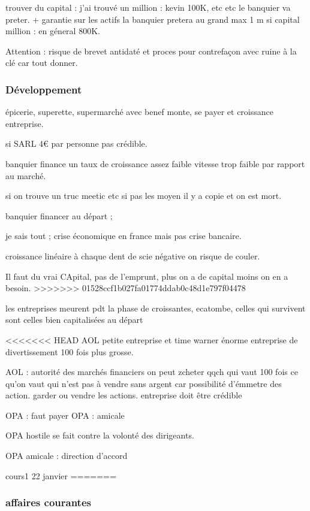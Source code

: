 \documentclass[a4paper,12pt]{article}
\begin{document}
trouver du capital : j'ai trouvé un million : kevin 100K, etc  etc 
le banquier va preter. + garantie sur les actifs la banquier pretera au grand max
1 m si capital million : en géneral 800K.

Attention : risque de brevet antidaté et proces pour contrefaçon avec ruine à la clé car tout donner.

\subsubsection{Développement}

épicerie, superette, supermarché avec benef monte, se payer et croissance entreprise. 


si SARL 4€ par personne pas crédible. 
 
banquier finance un taux de croissance assez faible vitesse trop faible par rapport au marché.

si on trouve un truc meetic etc si pas les moyen il y a copie et on est mort.

banquier financer au départ ; 

je sais tout ; 
crise économique en france mais pas crise bancaire.

croissance linéaire à chaque dent de scie négative on risque de couler.

Il faut du vrai CApital, pas de l'emprunt, plus on a de capital moins on en a besoin.
>>>>>>> 01528ccf1b027fa01774ddab0c48d1e797f04478

les entreprises meurent pdt la phase de croissantes, ecatombe, 
celles qui survivent sont celles bien capitalisées au départ

<<<<<<< HEAD
AOL petite entreprise et time warner énorme entreprise de divertissement 100 fois plus grosse.

AOL : autorité des marchés financiers
on peut zcheter qqch qui vaut 100 fois ce qu'on vaut qui n'est pas à vendre sans argent car possibilité d'émmetre des action.
garder ou vendre les actions.
entreprise doit être crédible

OPA : faut payer
OPA : amicale 

OPA hostile se fait contre la volonté des dirigeants.

OPA amicale : direction d'accord

cours1 22 janvier 
=======

\subsubsection{affaires courantes}
\end{document}
